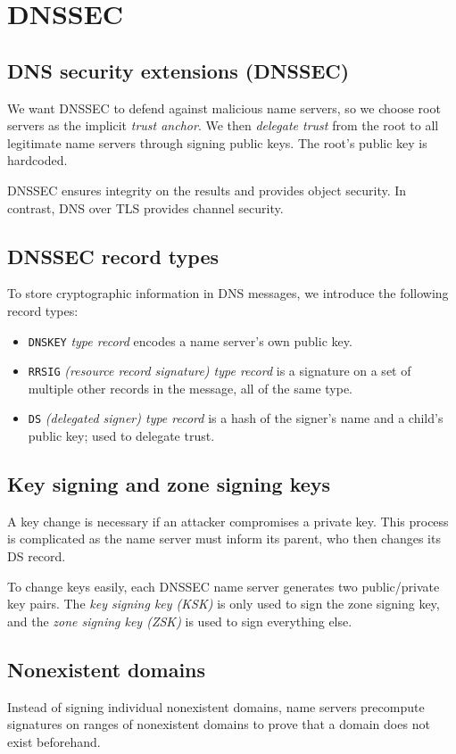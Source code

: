 \chapter{DNSSEC}

\section{DNS security extensions (DNSSEC)}
We want DNSSEC to defend against malicious name servers, so we choose root servers as the implicit \emph{trust anchor}. We then \emph{delegate trust} from the root to all legitimate name servers through signing public keys. The root's public key is hardcoded.

\medskip
DNSSEC ensures integrity on the results and provides object security. In contrast, DNS over TLS provides channel security.

\section{DNSSEC record types}
To store cryptographic information in DNS messages, we introduce the following record types:
\begin{itemize}
    \item \texttt{DNSKEY} \emph{type record} encodes a name server's own public key.
    \item \texttt{RRSIG} \emph{(resource record signature) type record} is a signature on a set of multiple other records in the message, all of the same type.
    \item \texttt{DS} \emph{(delegated signer) type record} is a hash of the signer’s name and a child’s public key; used to delegate trust.
\end{itemize}

\section{Key signing and zone signing keys}
A key change is necessary if an attacker compromises a private key. This process is complicated as the name server must inform its parent, who then changes its DS record. 

\medskip
To change keys easily, each DNSSEC name server generates two public/private key pairs. The \emph{key signing key (KSK)} is only used to sign the zone signing key, and the \emph{zone signing key (ZSK)} is used to sign everything else.

\section{Nonexistent domains}
Instead of signing individual nonexistent domains, name servers precompute signatures on ranges of nonexistent domains to prove that a domain does not exist beforehand.

